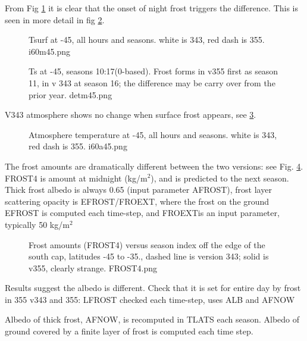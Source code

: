 \documentclass{article}
\begin{document}
From Fig \ref{i60m45} it is clear that the onset of night frost triggers the difference. This is seen in more detail in fig \ref{detm45}.

\begin{figure}[!ht] 
\caption[Ts at 45S]{Tsurf at -45, all hours and seasons. white is 343, red dash is 355. 
\label{i60m45}  i60m45.png }
\end{figure} 

\begin{figure}[!ht] 
\caption[Ts at 45S, seasons 10:17]{Ts at -45, seasons 10:17(0-based). Frost
  forms in v355 first as season 11, in v 343 at season 16; the difference may be
  carry over from the prior year.
\label{detm45}  detm45.png }
\end{figure} 

V343 atmosphere shows no change when surface frost appears, see \ref{i60a45}.
\begin{figure}[!ht] 
\caption[Tatm at 45S]{Atmosphere temperature at -45, all hours and seasons. white is 343, red dash is 355. 
\label{i60a45}  i60a45.png }
\end{figure} 

The frost amounts are dramatically different between the two versions: see Fig.
\ref{FROST4}. FROST4 is amount at midnight (kg/m$^2$), and is predicted to the
next season. Thick frost albedo is always 0.65 (input parameter AFROST), frost
layer scattering opacity is EFROST/FROEXT, where the frost on the ground EFROST
is computed each time-step, and FROEXTis an input parameter, typically 50
kg/m$^2$

\begin{figure}[!ht] 
\caption[Frost near south cap]{Frost amounts (FROST4) versus season index off
  the edge of the south cap, latitudes -45 to -35., dashed line is version 343;
  solid is v355, clearly strange.
\label{FROST4}  FROST4.png }
\end{figure} 

Results suggest the albedo is different.
\qi Check that it is set for entire day by frost in 355 
\qii v343 and 355: LFROST checked each time-step,  uses ALB and AFNOW

Albedo of thick frost, AFNOW, is recomputed in TLATS each season.
 Albedo of ground covered by a finite layer of frost is computed each time step.
\end{document}
